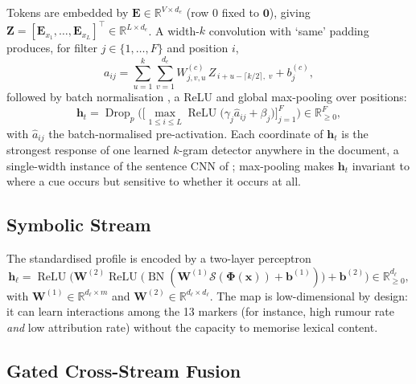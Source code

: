 Tokens are embedded by $\mathbf{E}\in\mathbb{R}^{V\times d_e}$ (row $0$ fixed to $\mathbf{0}$), giving
$\mathbf{Z}=[\mathbf{E}_{x_1},\dots,\mathbf{E}_{x_L}]^{\top}\in\mathbb{R}^{L\times d_e}$. A width-$k$ convolution with
`same' padding produces, for filter $j\in\{1,\dots,F\}$ and position $i$,
\begin{equation}
a_{ij}=\sum_{u=1}^{k}\sum_{v=1}^{d_e}W^{(c)}_{j,v,u}\,Z_{\,i+u-\lceil k/2\rceil,\;v}+b^{(c)}_j ,
\label{eq:conv}
\end{equation}
followed by batch normalisation \citep{ioffe2015bn}, a ReLU and global max-pooling over positions:
\begin{equation}
\mathbf{h}_t=\operatorname{Drop}_{p}\Big(\big[\max_{1\le i\le L}\operatorname{ReLU}\big(\gamma_j\hat{a}_{ij}+\beta_j\big)\big]_{j=1}^{F}\Big)\in\mathbb{R}_{\ge0}^{F},
\label{eq:hcontext}
\end{equation}
with $\hat{a}_{ij}$ the batch-normalised pre-activation. Each coordinate of $\mathbf{h}_t$ is the strongest
response of one learned $k$-gram detector anywhere in the document, a single-width instance of the
sentence CNN of \citet{kim2014cnn}; max-pooling makes $\mathbf{h}_t$ invariant to where a cue occurs but
sensitive to whether it occurs at all.

\subsection{Symbolic Stream}
\label{sec:symbolic}

The standardised profile is encoded by a two-layer perceptron
\begin{equation}
\mathbf{h}_\ell=\operatorname{ReLU}\Big(\mathbf{W}^{(2)}\operatorname{ReLU}\big(\operatorname{BN}(\mathbf{W}^{(1)}\mathcal{S}(\bm{\Phi}(\mathbf{x}))+\mathbf{b}^{(1)})\big)+\mathbf{b}^{(2)}\Big)\in\mathbb{R}_{\ge0}^{d_\ell},
\end{equation}
with $\mathbf{W}^{(1)}\in\mathbb{R}^{d_\ell\times m}$ and $\mathbf{W}^{(2)}\in\mathbb{R}^{d_\ell\times d_\ell}$. The map
is low-dimensional by design: it can learn interactions among the 13 markers (for instance, high rumour
rate \emph{and} low attribution rate) without the capacity to memorise lexical content.

\subsection{Gated Cross-Stream Fusion}
\label{sec:fusion}

